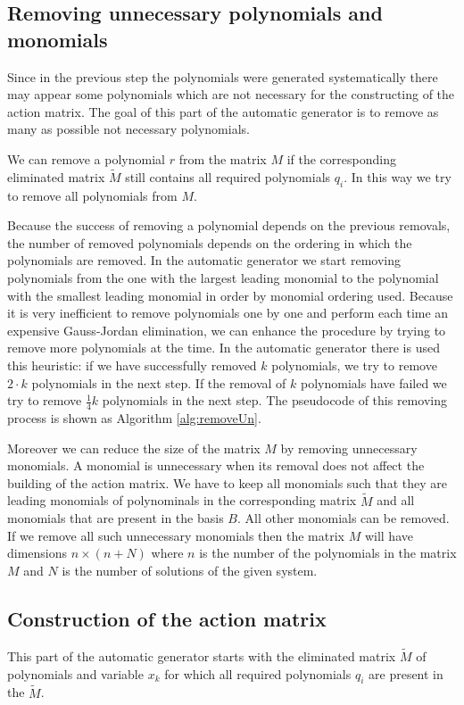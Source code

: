 \subsection{Removing unnecessary polynomials and monomials}
\label{subsec:removingUnPols}
Since in the previous step the polynomials were generated systematically there may appear some polynomials which are not necessary for the constructing of the action matrix. The goal of this part of the automatic generator is to remove as many as possible not necessary polynomials.

We can remove a polynomial $r$ from the matrix $M$ if the corresponding eliminated matrix $\tilde{M}$ still contains all required polynomials $q_i$. In this way we try to remove all polynomials from $M$.

Because the success of removing a polynomial depends on the previous removals, the number of removed polynomials depends on the ordering in which the polynomials are removed. In the automatic generator we start removing polynomials from the one with the largest leading monomial to the polynomial with the smallest leading monomial in order by monomial ordering used. Because it is very inefficient to remove polynomials one by one and perform each time an expensive Gauss-Jordan elimination, we can enhance the procedure by trying to remove more polynomials at the time. In the automatic generator there is used this heuristic: if we have successfully removed $k$ polynomials, we try to remove $2\cdot k$ polynomials in the next step. If the removal of $k$ polynomials have failed we try to remove $\frac{1}{4}k$ polynomials in the next step. The pseudocode of this removing process is shown as Algorithm \ref{alg:removeUn}.



Moreover we can reduce the size of the matrix $M$ by removing unnecessary monomials. A monomial is unnecessary when its removal does not affect the building of the action matrix. We have to keep all monomials such that they are leading monomials of polynominals in the corresponding matrix $\tilde{M}$ and all monomials that are present in the basis $B$. All other monomials can be removed. If we remove all such unnecessary monomials then the matrix $M$ will have dimensions $n \times (n + N)$ where $n$ is the number of the polynomials in the matrix $M$ and $N$ is the number of solutions of the given system.

\subsection{Construction of the action matrix}
This part of the automatic generator starts with the eliminated matrix $\tilde{M}$ of polynomials and variable $x_k$ for which all required polynomials $q_i$ are present in the $\tilde{M}$.

